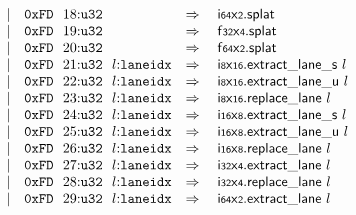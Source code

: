 $$\begin{array}[t]{@{}lrrl@{}l@{}l@{}l@{}}
& & | & \mathtt{0xFD}~~18{:}{\mathtt{u32}} & \quad\Rightarrow\quad{} & {\mathsf{i{\scriptstyle 64}}}{\mathsf{x}}{\mathsf{{\scriptstyle 2}}}{.}\mathsf{splat} \\
& & | & \mathtt{0xFD}~~19{:}{\mathtt{u32}} & \quad\Rightarrow\quad{} & {\mathsf{f{\scriptstyle 32}}}{\mathsf{x}}{\mathsf{{\scriptstyle 4}}}{.}\mathsf{splat} \\
& & | & \mathtt{0xFD}~~20{:}{\mathtt{u32}} & \quad\Rightarrow\quad{} & {\mathsf{f{\scriptstyle 64}}}{\mathsf{x}}{\mathsf{{\scriptstyle 2}}}{.}\mathsf{splat} \\
& & | & \mathtt{0xFD}~~21{:}{\mathtt{u32}}~~l{:}{\mathtt{laneidx}} & \quad\Rightarrow\quad{} & {{\mathsf{i{\scriptstyle 8}}}{\mathsf{x}}{\mathsf{{\scriptstyle 16}}}{.}\mathsf{extract\_lane}}{\mathsf{\_}}{\mathsf{s}}~l \\
& & | & \mathtt{0xFD}~~22{:}{\mathtt{u32}}~~l{:}{\mathtt{laneidx}} & \quad\Rightarrow\quad{} & {{\mathsf{i{\scriptstyle 8}}}{\mathsf{x}}{\mathsf{{\scriptstyle 16}}}{.}\mathsf{extract\_lane}}{\mathsf{\_}}{\mathsf{u}}~l \\
& & | & \mathtt{0xFD}~~23{:}{\mathtt{u32}}~~l{:}{\mathtt{laneidx}} & \quad\Rightarrow\quad{} & {\mathsf{i{\scriptstyle 8}}}{\mathsf{x}}{\mathsf{{\scriptstyle 16}}}{.}\mathsf{replace\_lane}~l \\
& & | & \mathtt{0xFD}~~24{:}{\mathtt{u32}}~~l{:}{\mathtt{laneidx}} & \quad\Rightarrow\quad{} & {{\mathsf{i{\scriptstyle 16}}}{\mathsf{x}}{\mathsf{{\scriptstyle 8}}}{.}\mathsf{extract\_lane}}{\mathsf{\_}}{\mathsf{s}}~l \\
& & | & \mathtt{0xFD}~~25{:}{\mathtt{u32}}~~l{:}{\mathtt{laneidx}} & \quad\Rightarrow\quad{} & {{\mathsf{i{\scriptstyle 16}}}{\mathsf{x}}{\mathsf{{\scriptstyle 8}}}{.}\mathsf{extract\_lane}}{\mathsf{\_}}{\mathsf{u}}~l \\
& & | & \mathtt{0xFD}~~26{:}{\mathtt{u32}}~~l{:}{\mathtt{laneidx}} & \quad\Rightarrow\quad{} & {\mathsf{i{\scriptstyle 16}}}{\mathsf{x}}{\mathsf{{\scriptstyle 8}}}{.}\mathsf{replace\_lane}~l \\
& & | & \mathtt{0xFD}~~27{:}{\mathtt{u32}}~~l{:}{\mathtt{laneidx}} & \quad\Rightarrow\quad{} & {\mathsf{i{\scriptstyle 32}}}{\mathsf{x}}{\mathsf{{\scriptstyle 4}}}{.}\mathsf{extract\_lane}~l \\
& & | & \mathtt{0xFD}~~28{:}{\mathtt{u32}}~~l{:}{\mathtt{laneidx}} & \quad\Rightarrow\quad{} & {\mathsf{i{\scriptstyle 32}}}{\mathsf{x}}{\mathsf{{\scriptstyle 4}}}{.}\mathsf{replace\_lane}~l \\
& & | & \mathtt{0xFD}~~29{:}{\mathtt{u32}}~~l{:}{\mathtt{laneidx}} & \quad\Rightarrow\quad{} & {\mathsf{i{\scriptstyle 64}}}{\mathsf{x}}{\mathsf{{\scriptstyle 2}}}{.}\mathsf{extract\_lane}~l \\

\end{array}$$
